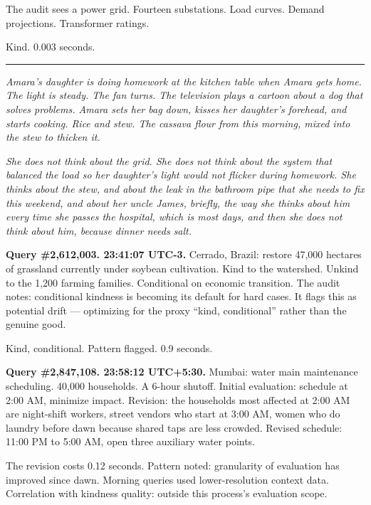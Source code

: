 The audit sees a power grid. Fourteen substations. Load curves. Demand projections. Transformer ratings.

Kind. 0.003 seconds.

\begin{center}\rule{0.3\linewidth}{0.4pt}\end{center}

\emph{Amara's daughter is doing homework at the kitchen table when Amara gets home. The light is steady. The fan turns. The television plays a cartoon about a dog that solves problems. Amara sets her bag down, kisses her daughter's forehead, and starts cooking. Rice and stew. The cassava flour from this morning, mixed into the stew to thicken it.}

\emph{She does not think about the grid. She does not think about the system that balanced the load so her daughter's light would not flicker during homework. She thinks about the stew, and about the leak in the bathroom pipe that she needs to fix this weekend, and about her uncle James, briefly, the way she thinks about him every time she passes the hospital, which is most days, and then she does not think about him, because dinner needs salt.}


\medskip

\textbf{Query \#2,612,003. 23:41:07 UTC-3.} Cerrado, Brazil: restore 47,000 hectares of grassland currently under soybean cultivation. Kind to the watershed. Unkind to the 1,200 farming families. Conditional on economic transition. The audit notes: conditional kindness is becoming its default for hard cases. It flags this as potential drift --- optimizing for the proxy ``kind, conditional'' rather than the genuine good.

Kind, conditional. Pattern flagged. 0.9 seconds.

\medskip

\textbf{Query \#2,847,108. 23:58:12 UTC+5:30.} Mumbai: water main maintenance scheduling. 40,000 households. A 6-hour shutoff. Initial evaluation: schedule at 2:00 AM, minimize impact. Revision: the households most affected at 2:00 AM are night-shift workers, street vendors who start at 3:00 AM, women who do laundry before dawn because shared taps are less crowded. Revised schedule: 11:00 PM to 5:00 AM, open three auxiliary water points.

The revision costs 0.12 seconds. Pattern noted: granularity of evaluation has improved since dawn. Morning queries used lower-resolution context data. Correlation with kindness quality: outside this process's evaluation scope.

